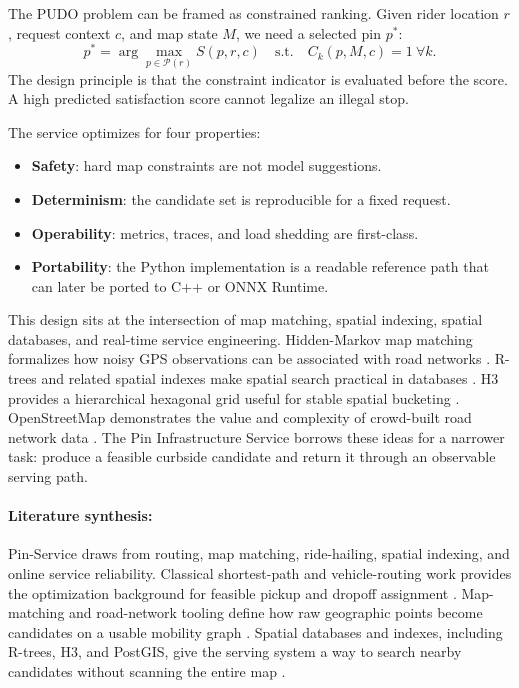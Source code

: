 \documentclass{article}
\begin{document}
The PUDO problem can be framed as constrained ranking. Given rider location $r$, request context $c$, and map state $M$, we need a selected pin $p^*$:
\begin{equation}
  p^* = \arg\max_{p\in\mathcal{P}(r)} S(p,r,c)
  \quad \text{s.t.}\quad C_k(p,M,c)=1\ \forall k.
\end{equation}
The design principle is that the constraint indicator is evaluated before the score. A high predicted satisfaction score cannot legalize an illegal stop.

The service optimizes for four properties:
\begin{itemize}
  \item \textbf{Safety}: hard map constraints are not model suggestions.
  \item \textbf{Determinism}: the candidate set is reproducible for a fixed request.
  \item \textbf{Operability}: metrics, traces, and load shedding are first-class.
  \item \textbf{Portability}: the Python implementation is a readable reference path that can later be ported to C++ or ONNX Runtime.
\end{itemize}

This design sits at the intersection of map matching, spatial indexing, spatial databases, and real-time service engineering. Hidden-Markov map matching formalizes how noisy GPS observations can be associated with road networks \citep{newson2009hidden}. R-trees and related spatial indexes make spatial search practical in databases \citep{guttman1984rtree}. H3 provides a hierarchical hexagonal grid useful for stable spatial bucketing \citep{h3}. OpenStreetMap demonstrates the value and complexity of crowd-built road network data \citep{haklay2008osm}. The Pin Infrastructure Service borrows these ideas for a narrower task: produce a feasible curbside candidate and return it through an observable serving path.



\paragraph{Literature synthesis:}
Pin-Service draws from routing, map matching, ride-hailing, spatial indexing, and online service reliability. Classical shortest-path and vehicle-routing work provides the optimization background for feasible pickup and dropoff assignment \citep{dijkstra1959,hart1968astar,dantzig1959truck,savelsbergh1995vehicle,laporte2009fifty}. Map-matching and road-network tooling define how raw geographic points become candidates on a usable mobility graph \citep{newson2009hidden,brakatsoulas2005mapmatching,boeing2017osmnx,luxen2011osrm}. Spatial databases and indexes, including R-trees, H3, and PostGIS, give the serving system a way to search nearby candidates without scanning the entire map \citep{guttman1984rtree,beckmann1990rstar,h3,postgis}.
\end{document}
